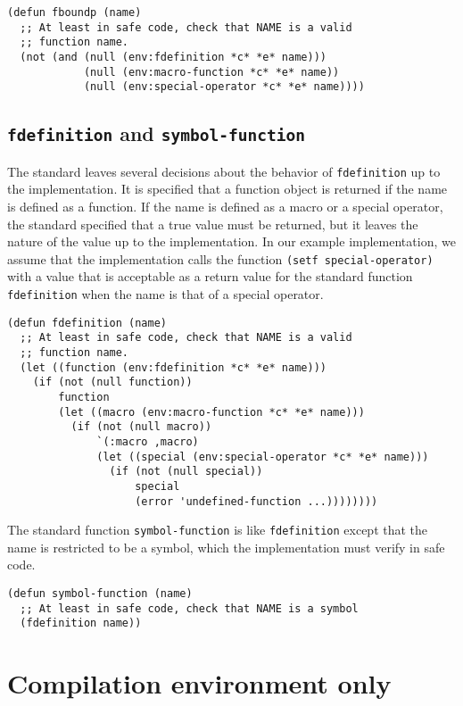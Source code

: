 \begin{verbatim}
(defun fboundp (name)
  ;; At least in safe code, check that NAME is a valid
  ;; function name.
  (not (and (null (env:fdefinition *c* *e* name)))
            (null (env:macro-function *c* *e* name))
            (null (env:special-operator *c* *e* name))))
\end{verbatim}

\subsection{\texttt{fdefinition} and \texttt{symbol-function}}

The standard leaves several decisions about the behavior of
\texttt{fdefinition} up to the implementation.  It is specified that a
function object is returned if the name is defined as a function.  If
the name is defined as a macro or a special operator, the standard
specified that a true value must be returned, but it leaves the nature
of the value up to the implementation.  In our example implementation,
we assume that the \commonlisp{} implementation calls the \sysname{}
function \texttt{(setf special-operator)} with a value that is
acceptable as a return value for the standard function
\texttt{fdefinition} when the name is that of a special operator.

\begin{verbatim}
(defun fdefinition (name)
  ;; At least in safe code, check that NAME is a valid
  ;; function name.
  (let ((function (env:fdefinition *c* *e* name)))
    (if (not (null function))
        function
        (let ((macro (env:macro-function *c* *e* name)))
          (if (not (null macro))
              `(:macro ,macro)
              (let ((special (env:special-operator *c* *e* name)))
                (if (not (null special))
                    special
                    (error 'undefined-function ...))))))))
\end{verbatim}

The standard function \texttt{symbol-function} is like
\texttt{fdefinition} except that the name is restricted to be a
symbol, which the implementation must verify in safe code.

\begin{verbatim}
(defun symbol-function (name)
  ;; At least in safe code, check that NAME is a symbol
  (fdefinition name))
\end{verbatim}

\section{Compilation environment only}

